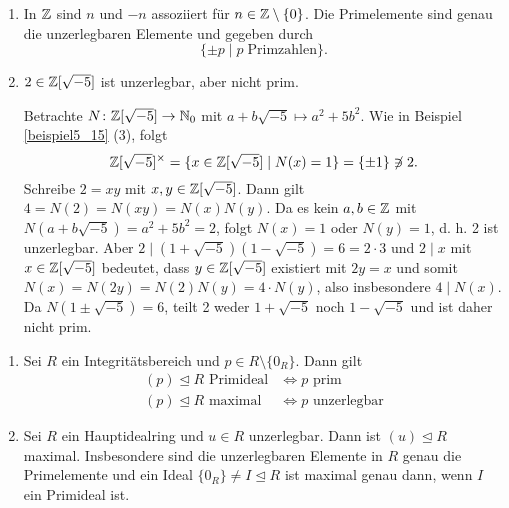 \begin{beispiel}\label{beispiel6_8}
	\begin{enumerate}[label=(\arabic*)]
		\item In $\mathbb{Z}$ sind $n$ und $-n$ assoziiert für $n \in \mathbb{Z} \setminus \{0\}$. Die Primelemente sind genau die unzerlegbaren Elemente und gegeben durch
		\[\{\pm p \mid p \;\text{Primzahlen}\}.\]
		\item $2 \in \mathbb{Z}[\sqrt{-5}]$ ist unzerlegbar, aber nicht prim.
		\begin{inlproof}
			Betrachte $N \colon \mathbb{Z}[\sqrt{-5}] \to \mathbb{N}_0$ mit $a+b\sqrt{-5} \mapsto a^2 + 5b^2$. Wie in Beispiel \ref{beispiel5_15} (3), folgt
			\[\mathbb{Z}[\sqrt{-5}]^\times = \{x \in \mathbb{Z}[\sqrt{-5}] \mid N(x) = 1\} = \{\pm 1\} \not\ni 2.\]
			Schreibe $2 = xy$ mit $x,y \in \mathbb{Z}[\sqrt{-5}]$. Dann gilt $4 = N(2) = N(xy) = N(x)N(y)$. Da es kein $a,b \in \mathbb{Z}$ mit $N(a+b\sqrt{-5}) = a^2 + 5b^2 = 2$, folgt $N(x) = 1$ oder $N(y) = 1$, d. h. 2 ist unzerlegbar. Aber $2 \mid (1 + \sqrt{-5})(1 - \sqrt{-5}) = 6 = 2 \cdot 3$ und $2 \mid x$ mit $x \in \mathbb{Z}[\sqrt{-5}]$ bedeutet, dass $y \in \mathbb{Z}[\sqrt{-5}]$ existiert mit $2y = x$ und somit $N(x) = N(2y) = N(2) N(y) = 4 \cdot N(y)$, also insbesondere $4 \mid N(x)$. Da $N(1 \pm \sqrt{-5}) = 6$, teilt 2 weder $1 + \sqrt{-5}$ noch $1 - \sqrt{-5}$ und ist daher nicht prim.
		\end{inlproof}
	\end{enumerate}
\end{beispiel}
\begin{prop}\label{prop6_9}
\begin{enumerate}[label=(\alph*)]
	\item 	Sei $R$ ein Integritätsbereich und $p \in R \setminus \{0_R\}$. Dann gilt
	\begin{align*}
		(p) \unlhd R \text{ Primideal} &\Leftrightarrow p \text{ prim}\\
		(p) \unlhd R \text{ maximal} &\Leftrightarrow p \text{ unzerlegbar}
	\end{align*}
	\item Sei $R$ ein Hauptidealring und $u \in R$ unzerlegbar. Dann ist $(u) \unlhd R$ maximal. Insbesondere sind die unzerlegbaren Elemente in $R$ genau die Primelemente und ein Ideal $\{0_R\} \neq I \unlhd R$ ist maximal genau dann, wenn $I$ ein Primideal ist.
\end{enumerate}	
\end{prop}
